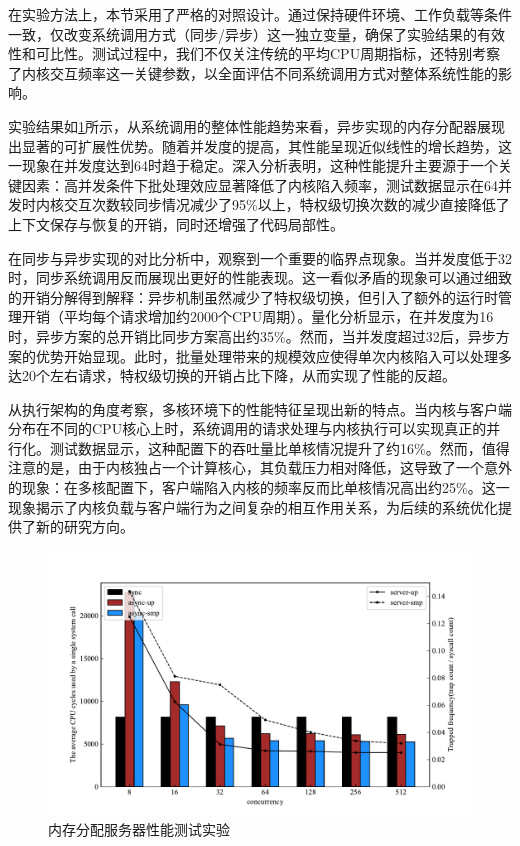 在实验方法上，本节采用了严格的对照设计。通过保持硬件环境、工作负载等条件一致，仅改变系统调用方式（同步/异步）这一独立变量，确保了实验结果的有效性和可比性。测试过程中，我们不仅关注传统的平均CPU周期指标，还特别考察了内核交互频率这一关键参数，以全面评估不同系统调用方式对整体系统性能的影响。

实验结果如\ref{fig:syscall_test}所示，从系统调用的整体性能趋势来看，异步实现的内存分配器展现出显著的可扩展性优势。随着并发度的提高，其性能呈现近似线性的增长趋势，这一现象在并发度达到64时趋于稳定。深入分析表明，这种性能提升主要源于一个关键因素：高并发条件下批处理效应显著降低了内核陷入频率，测试数据显示在64并发时内核交互次数较同步情况减少了95\%以上，特权级切换次数的减少直接降低了上下文保存与恢复的开销，同时还增强了代码局部性。

在同步与异步实现的对比分析中，观察到一个重要的临界点现象。当并发度低于32时，同步系统调用反而展现出更好的性能表现。这一看似矛盾的现象可以通过细致的开销分解得到解释：异步机制虽然减少了特权级切换，但引入了额外的运行时管理开销（平均每个请求增加约2000个CPU周期）。量化分析显示，在并发度为16时，异步方案的总开销比同步方案高出约35\%。然而，当并发度超过32后，异步方案的优势开始显现。此时，批量处理带来的规模效应使得单次内核陷入可以处理多达20个左右请求，特权级切换的开销占比下降，从而实现了性能的反超。

从执行架构的角度考察，多核环境下的性能特征呈现出新的特点。当内核与客户端分布在不同的CPU核心上时，系统调用的请求处理与内核执行可以实现真正的并行化。测试数据显示，这种配置下的吞吐量比单核情况提升了约16\%。然而，值得注意的是，由于内核独占一个计算核心，其负载压力相对降低，这导致了一个意外的现象：在多核配置下，客户端陷入内核的频率反而比单核情况高出约25\%。这一现象揭示了内核负载与客户端行为之间复杂的相互作用关系，为后续的系统优化提供了新的研究方向。

\begin{figure}[htbp]
    \centering
    \includegraphics[width=1.0\textwidth]{figures/syscall_test.pdf}
    \caption{内存分配服务器性能测试实验}\label{fig:syscall_test}
\end{figure}

